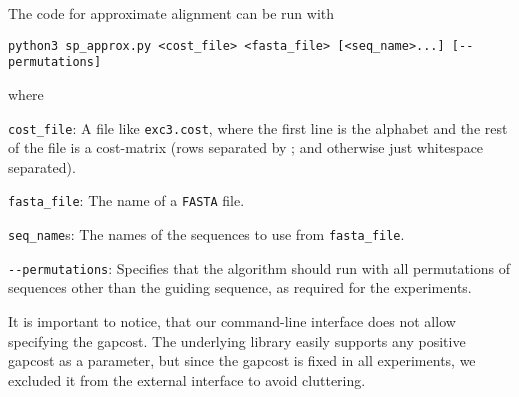 The code for approximate alignment can be run with

\begin{verbatim}
python3 sp_approx.py <cost_file> <fasta_file> [<seq_name>...] [--permutations]
\end{verbatim}

where

\begin{description}
\item{\verb|cost_file|:} A file like \verb|exc3.cost|, where the
  first line is the alphabet and the rest of the file is a cost-matrix
  (rows separated by ; and otherwise just whitespace separated).
\item{\verb|fasta_file|:} The name of a \verb|FASTA| file.
\item{\verb|seq_name|s:} The names of the sequences to use from
  \verb|fasta_file|.
\item{\verb|--permutations|:} Specifies that the algorithm should run
  with all permutations of sequences other than the guiding sequence,
  as required for the experiments.
\end{description}

It is important to notice, that our command-line interface does not allow specifying the gapcost. The underlying library easily supports any positive gapcost as a parameter, but since the gapcost is fixed in all experiments, we excluded it from the external interface to avoid cluttering. 
